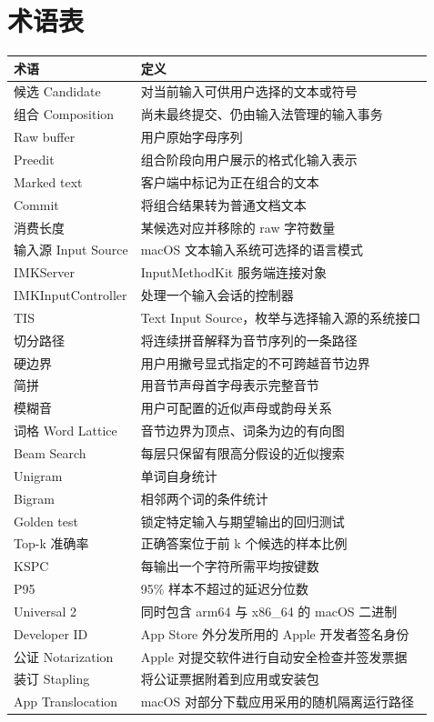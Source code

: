 \chapter{术语表}

\begin{longtable}{p{3.7cm}p{7.5cm}}
\toprule
术语 & 定义 \\
\midrule
候选 Candidate & 对当前输入可供用户选择的文本或符号 \\
组合 Composition & 尚未最终提交、仍由输入法管理的输入事务 \\
Raw buffer & 用户原始字母序列 \\
Preedit & 组合阶段向用户展示的格式化输入表示 \\
Marked text & 客户端中标记为正在组合的文本 \\
Commit & 将组合结果转为普通文档文本 \\
消费长度 & 某候选对应并移除的 raw 字符数量 \\
输入源 Input Source & macOS 文本输入系统可选择的语言模式 \\
IMKServer & InputMethodKit 服务端连接对象 \\
IMKInputController & 处理一个输入会话的控制器 \\
TIS & Text Input Source，枚举与选择输入源的系统接口 \\
切分路径 & 将连续拼音解释为音节序列的一条路径 \\
硬边界 & 用户用撇号显式指定的不可跨越音节边界 \\
简拼 & 用音节声母首字母表示完整音节 \\
模糊音 & 用户可配置的近似声母或韵母关系 \\
词格 Word Lattice & 音节边界为顶点、词条为边的有向图 \\
Beam Search & 每层只保留有限高分假设的近似搜索 \\
Unigram & 单词自身统计 \\
Bigram & 相邻两个词的条件统计 \\
Golden test & 锁定特定输入与期望输出的回归测试 \\
Top-k 准确率 & 正确答案位于前 k 个候选的样本比例 \\
KSPC & 每输出一个字符所需平均按键数 \\
P95 & 95\% 样本不超过的延迟分位数 \\
Universal 2 & 同时包含 arm64 与 x86\_64 的 macOS 二进制 \\
Developer ID & App Store 外分发所用的 Apple 开发者签名身份 \\
公证 Notarization & Apple 对提交软件进行自动安全检查并签发票据 \\
装订 Stapling & 将公证票据附着到应用或安装包 \\
App Translocation & macOS 对部分下载应用采用的随机隔离运行路径 \\
\bottomrule
\end{longtable}


